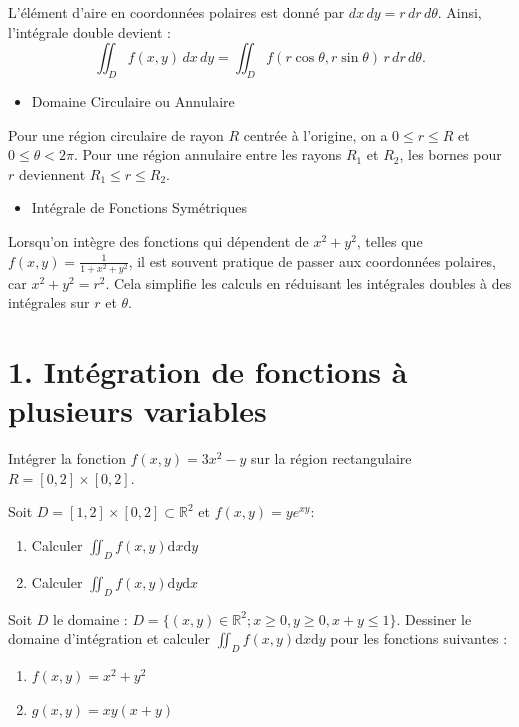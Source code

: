 L'élément d'aire en coordonnées polaires est donné par \( dx \, dy = r \, dr \, d\theta \). Ainsi, l'intégrale double devient :
\[
\iint_D f(x, y) \, dx \, dy = \iint_D f(r \cos \theta, r \sin \theta) \, r \, dr \, d\theta.
\]

\begin{itemize}
    \item Domaine Circulaire ou Annulaire
\end{itemize}

Pour une région circulaire de rayon \( R \) centrée à l'origine, on a \( 0 \leq r \leq R \) et \( 0 \leq \theta < 2\pi \). Pour une région annulaire entre les rayons \( R_1 \) et \( R_2 \), les bornes pour \( r \) deviennent \( R_1 \leq r \leq R_2 \). \\

\begin{itemize}
    \item Intégrale de Fonctions Symétriques
\end{itemize}

Lorsqu'on intègre des fonctions qui dépendent de \( x^2 + y^2 \), telles que \( f(x, y) = \frac{1}{1 + x^2 + y^2} \), il est souvent pratique de passer aux coordonnées polaires, car \( x^2 + y^2 = r^2 \). Cela simplifie les calculs en réduisant les intégrales doubles à des intégrales sur \( r \) et \( \theta \).

\section*{1. Intégration de fonctions à plusieurs variables}

\begin{exercise} %
    Intégrer la fonction $f(x,y)=3x^2-y$ sur la région rectangulaire $R=[0,2]\times[0,2].$
\end{exercise}

\begin{exercise} %
    Soit $D=[1,2]\times [0,2]\subset \mathbb{R}^2$ et $f(x,y) = ye^{xy}$:
    \begin{enumerate}[label=(\alph*)]
        \item Calculer $\displaystyle\iint_Df(x,y){\mathrm d}x{\mathrm d}y$
        \item Calculer $\displaystyle\iint_Df(x,y){\mathrm d}y{\mathrm d}x$
    \end{enumerate}
\end{exercise}

\begin{exercise} %
    Soit $D$ le domaine : $D = \{(x,y)\in\mathbb{R}^2;x\geq0,y\geq0,x+y\leq1\}$. Dessiner le domaine d'intégration et calculer $\displaystyle\iint_Df(x,y){\mathrm d}x{\mathrm d}y$ pour les fonctions suivantes :
    \begin{enumerate}[label=(\alph*)]
        \item $f(x,y) = x^2+y^2$
        \item $g(x,y) = xy(x+y)$
    \end{enumerate}
\end{exercise}

